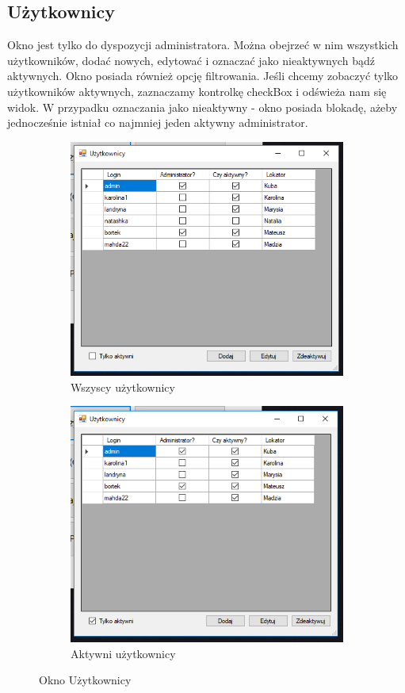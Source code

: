 \documentclass{article}
\begin{document}
\subsection{Użytkownicy}
Okno jest tylko do dyspozycji administratora. Można obejrzeć w nim wszystkich użytkowników, dodać nowych, edytować i oznaczać jako nieaktywnych bądź aktywnych. Okno posiada również opcję filtrowania. Jeśli chcemy zobaczyć tylko użytkowników aktywnych, zaznaczamy kontrolkę checkBox i odświeża nam się widok. W przypadku oznaczania jako nieaktywny - okno posiada blokadę, ażeby jednocześnie istniał co najmniej jeden aktywny administrator.
\begin{figure}[!ht]
\centering
  \begin{subfigure}[b]{0.45\textwidth}
  \includegraphics[width=\textwidth]{users.PNG}
  \caption{Wszyscy użytkownicy}
  \end{subfigure}
  \begin{subfigure}[b]{0.45\textwidth}
  \includegraphics[width=\textwidth]{active.PNG}
  \caption{Aktywni użytkownicy}
  \end{subfigure}
  \caption{Okno Użytkownicy}
\end{figure}
\newpage
\end{document}
